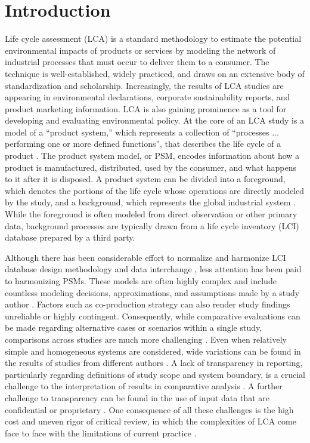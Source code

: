 \section{Introduction}

Life cycle assessment (LCA) is a standard methodology to estimate the potential environmental impacts of products or services by modeling the network of industrial processes that must occur to deliver 
them to a consumer.  The technique is well-established, widely practiced, and draws on an extensive body of standardization and scholarship.
Increasingly, the results of LCA studies are appearing in environmental declarations, corporate sustainability reports, and product marketing information.  LCA is also gaining prominence as a tool for developing and evaluating environmental policy.  
%
At the core of an LCA study is a model of a ``product system,'' which represents a collection of ``processes $\ldots$ performing one or more defined functions'', that describes the life cycle of a product \citep{iso14044}.  The product system model, or PSM, encodes information about how a product is manufactured, distributed, used by the consumer, and what happens to it after it is disposed.  A product system can be divided into a foreground, which denotes the portions of the life cycle whose operations are directly modeled by the study, and a background, which represents the global industrial system \citep{SETAC_inventory_1998}.  While the foreground is often modeled from direct observation or other primary data, background processes are typically drawn from a life cycle inventory (LCI) database prepared by a third party.

Although there has been considerable effort to normalize and harmonize 
LCI database design methodology and data interchange \citep{UNEP_2011, JRC_ILCD_ELCD_2013, Mila_e_Canals_2015, Ingwersen_JLCA_2015}, less attention has been paid to harmonizing PSMs.  These models are often highly complex and include countless modeling decisions, approximations, and assumptions made by a study author \citep{Lloyd2007, reap2008_I}.
Factors such as co-production strategy \citep{Finnveden_1999, Pelletier_2014} can also render study findings unreliable or highly contingent.  Consequently, while comparative evaluations can be made regarding alternative cases or scenarios within a single study, comparisons across studies are much more challenging \citep{Heath2012, Henriksson2014}.  Even when relatively simple and homogeneous systems are considered, wide variations can be found in the results of studies from different authors \citep{van_der_Harst_2013, Turconi_2013}.
A lack of transparency in reporting, particularly regarding definitions of study scope and system boundary,
is a crucial challenge to the interpretation of results in comparative analysis \citep{Cleary2009, Laurent_2014}.  A further challenge to transparency can be found in the use of input data that are confidential or proprietary \citep{Kuczenski_ESD_2017}.  One consequence of all these challenges is the high cost and uneven rigor of critical review, in which the complexities of LCA come face to face with the limitations of current practice \citep{Curran2014}.  


